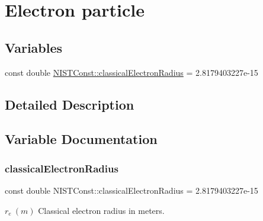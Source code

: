 \hypertarget{group___electron}{}\section{Electron particle}
\label{group___electron}
\subsection*{Variables}
\begin{DoxyCompactItemize}
\item 
const double \hyperlink{group___electron_gac67d6a01d8d75cb66290a36f7123942b}{N\+I\+S\+T\+Const\+::classical\+Electron\+Radius} = 2.\+8179403227e-\/15
\end{DoxyCompactItemize}


\subsection{Detailed Description}


\subsection{Variable Documentation}
\mbox{\label{group___electron_gac67d6a01d8d75cb66290a36f7123942b}} 
\subsubsection{\texorpdfstring{classical\+Electron\+Radius}{classicalElectronRadius}}
{\footnotesize\ttfamily const double N\+I\+S\+T\+Const\+::classical\+Electron\+Radius = 2.\+8179403227e-\/15}

$r_e \ (m)$ Classical electron radius in meters. 